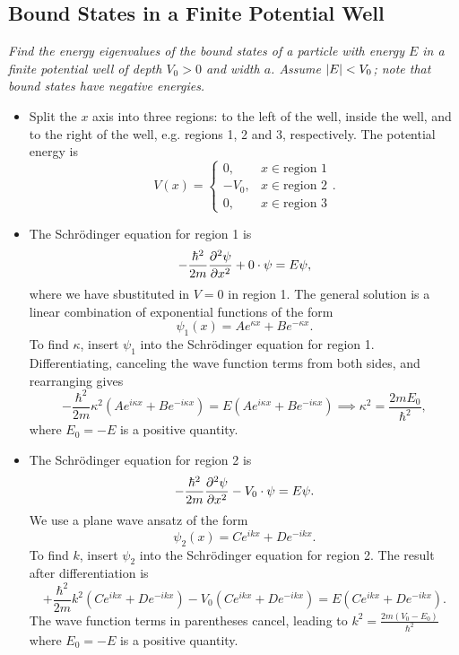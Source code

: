 \documentclass[11pt, a4paper]{article}
\newcommand{\Schro}{Schr\"{o}dinger\xspace}
\begin{document}
\subsection{Bound States in a Finite Potential Well}
\textit{Find the energy eigenvalues of the bound states of a particle with energy $ E $ in a finite potential well of depth $ V_{0} > 0 $ and width $ a $. Assume $ \abs{E} < V_{0} $; note that bound states have negative energies.}
\begin{itemize}
	\item Split the $ x $ axis into three regions: to the left of the well, inside the well, and to the right of the well, e.g. regions 1, 2 and 3, respectively. The potential energy is
	\begin{equation*}
		V(x) =
		\begin{cases}
			0, & x \in \text{region 1}\\
			- V_{0}, & x \in \text{region 2}\\
			0, & x \in \text{region 3}
		\end{cases}.
	\end{equation*}
	
	\item The \Schro equation for region 1 is
	\begin{equation*}
		- \frac{\hbar^{2}}{2m}\pdv[2]{\psi}{x} + 0 \cdot \psi = E \psi,
	\end{equation*}
    where we have sbustituted in $ V = 0 $ in region 1. The general solution is a linear combination of exponential functions of the form
	\begin{equation*}
		\psi_{1}(x) = A e^{\kappa x} + B e^{- \kappa x}.
	\end{equation*}
	To find $ \kappa $, insert $ \psi_{1} $ into the \Schro equation for region 1. Differentiating, canceling the wave function terms from both sides, and rearranging gives
	\begin{equation*}
		-\frac{\hbar^{2}}{2m} \kappa^{2}\left(Ae^{i\kappa x} + B e^{- i\kappa x}\right) = E \left(A e^{i\kappa x} + B e^{- i\kappa x}\right) \implies \kappa^{2} = \frac{2mE_{0}}{\hbar^{2}},
	\end{equation*}
	where $ E_{0} = - E $ is a positive quantity.
	
	\item The \Schro equation for region 2 is
	\begin{equation*}
		- \frac{\hbar^{2}}{2m}\pdv[2]{\psi}{x} - V_{0} \cdot \psi = E \psi.
	\end{equation*}
	We use a plane wave ansatz of the form
	\begin{equation*}
		\psi_{2}(x) = Ce^{ikx} + De^{-ikx}.
	\end{equation*}
	To find $ k $, insert $ \psi_{2} $ into the \Schro equation for region 2. The result after differentiation is
	\begin{equation*}
		+\frac{\hbar^{2}}{2m} k^{2}\left(Ce^{ik x} + D e^{- ik x}\right) - V_{0}\left(C e^{ik x} + D e^{- ik x}\right)  = E \left(C e^{ik x} + D e^{- ik x}\right).
	\end{equation*}
	The wave function terms in parentheses cancel, leading to $ k^{2} = \frac{2m(V_{0}-E_{0})}{\hbar^{2}} $ where $ E_{0} = - E $ is a positive quantity.
	

\end{itemize}
\end{document}
